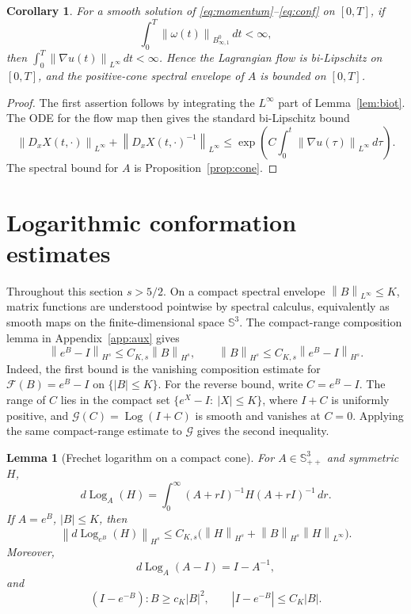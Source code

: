\documentclass[10pt,a4paper]{amsart}
\numberwithin{equation}{section}
\newtheorem{lemma}[theorem]{Lemma}
\newtheorem{corollary}[theorem]{Corollary}
\newcommand{\Id}{I}
\newcommand{\Spp}{\mathbb S_{++}}
\newcommand{\Sym}{\mathbb S}
\newcommand{\Log}{\operatorname{Log}}
\newcommand{\Besov}{B^0_{\infty,1}}
\newcommand{\norm}[1]{\left\lVert #1\right\rVert}
\begin{document}
\begin{corollary}
\label{cor:flow-cone}
For a smooth solution of \eqref{eq:momentum}--\eqref{eq:conf} on \([0,T]\),
if
\[
  \int_0^T\norm{\omega(t)}_{\Besov}\,dt<\infty,
\]
then \(\int_0^T\norm{\nabla u(t)}_{L^\infty}\,dt<\infty\).  Hence the
Lagrangian flow is bi-Lipschitz on \([0,T]\), and the positive-cone spectral
envelope of \(A\) is bounded on \([0,T]\).
\end{corollary}

\begin{proof}
The first assertion follows by integrating the \(L^\infty\) part of
Lemma~\ref{lem:biot}.  The ODE for the flow map then gives the standard
bi-Lipschitz bound
\[
  \norm{D_xX(t,\cdot)}_{L^\infty}
  +\norm{D_xX(t,\cdot)^{-1}}_{L^\infty}
  \le
  \exp\left(C\int_0^t\norm{\nabla u(\tau)}_{L^\infty}\,d\tau\right).
\]
The spectral bound for \(A\) is Proposition~\ref{prop:cone}.
\end{proof}

\section{Logarithmic conformation estimates}

Throughout this section \(s>5/2\).  On a compact spectral envelope
\(\norm{B}_{L^\infty}\le K\), matrix functions are understood pointwise by
spectral calculus, equivalently as smooth maps on the finite-dimensional
space \(\Sym^3\).  The compact-range composition lemma in
Appendix~\ref{app:aux} gives
\begin{equation}
  \norm{e^B-\Id}_{H^s}\le C_{K,s}\norm{B}_{H^s},
  \qquad
  \norm{B}_{H^s}\le C_{K,s}\norm{e^B-\Id}_{H^s}.
  \label{eq:matrix-moser}
\end{equation}
Indeed, the first bound is the vanishing composition estimate for
\(\mathcal F(B)=e^B-\Id\) on \(\{|B|\le K\}\).  For the reverse bound, write
\(C=e^B-\Id\).  The range of \(C\) lies in the compact set
\(\{e^X-\Id:\ |X|\le K\}\), where \(I+C\) is uniformly positive, and
\(\mathcal G(C)=\Log(I+C)\) is smooth and vanishes at \(C=0\).  Applying the
same compact-range estimate to \(\mathcal G\) gives the second inequality.

\begin{lemma}[Frechet logarithm on a compact cone]
\label{lem:frechet-log}
For \(A\in\Spp^3\) and symmetric \(H\),
\begin{equation}
  d\Log_A(H)=
  \int_0^\infty (A+r\Id)^{-1}H(A+r\Id)^{-1}\,dr .
  \label{eq:loewner}
\end{equation}
If \(A=e^B\), \(|B|\le K\), then
\begin{equation}
  \norm{d\Log_{e^B}(H)}_{H^s}
  \le
  C_{K,s}\bigl(\norm{H}_{H^s}+\norm{B}_{H^s}\norm{H}_{L^\infty}\bigr).
  \label{eq:frechet-tame}
\end{equation}
Moreover,
\begin{equation}
  d\Log_A(A-\Id)=\Id-A^{-1},
  \label{eq:log-relax-exact}
\end{equation}
and
\[
  (\Id-e^{-B}):B\ge c_K|B|^2,\qquad
  |\Id-e^{-B}|\le C_K|B|.
\]
\end{lemma}
\end{document}
